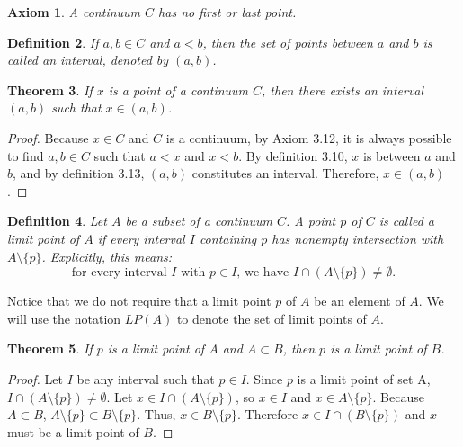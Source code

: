 \documentclass{amsart}
\newtheorem{theorem}{Theorem}
\newtheorem{axiom}[theorem]{Axiom}
\newtheorem{definition}[theorem]{Definition}
\newcommand{\1}{\mathds{1}}
\numberwithin{equation}{section}
\numberwithin{theorem}{section}
\begin{document}
\begin{axiom} A continuum $C$ has no first or last point.
\end{axiom}

\begin{definition} If $a,b\in C$ and $a < b$, then the set of points between $a$ and $b$ is called an \emph{interval}, denoted by $(a,b)$.  
\end{definition}



\begin{theorem}
	If $x$ is a point of a continuum $C$, then there exists an interval $(a,b)$ such that $x \in (a,b)$.
\end{theorem}

\begin{proof}
	Because $x\in C$ and $C$ is a continuum, by Axiom 3.12, it is always possible to find $a,b\in C$ such that $a<x$ and $x<b$. By definition 3.10, $x$ is between $a$ and $b$, and by definition 3.13, $(a,b)$ constitutes an interval. Therefore, $x\in (a,b)$.
\end{proof}

\begin{definition}
	Let $A$ be a subset of a continuum $C$.  A point $p$ of $C$ is called a \emph{limit point} of $A$ if every interval $I$ containing $p$ has nonempty intersection with $A \setminus \{p\}$.  Explicitly, this means:
	\[
	\text{for every interval $I$ with $p \in I$, we have $I \cap (A \setminus \{p \}) \neq \emptyset$.}
	\]
\end{definition}

Notice that we do not require that a limit point $p$ of $A$ be an element of $A$. We will use the notation $LP(A)$ to denote the set of limit points of $A.$ 

\begin{theorem} If $p$ is a limit point of $A$ and $A \subset B$, then $p$ is a limit point of $B$.
\end{theorem}

\begin{proof}
	Let $I$ be any interval such that $p\in I$. Since $p$ is a limit point of set A, $I \cap (A \setminus \{p \}) \neq \emptyset$. Let $x\in I \cap (A \setminus \{p \})$, so $x\in I$ and $x\in A \setminus \{p\}$. Because $A\subset B$, $A\setminus \{p\}\subset B\setminus\{p\}$. Thus, $x\in B\setminus \{p\}$. Therefore $x\in I \cap (B \setminus \{p \})$ and $x$ must be a limit point of $B$.
\end{proof}
\end{document}
